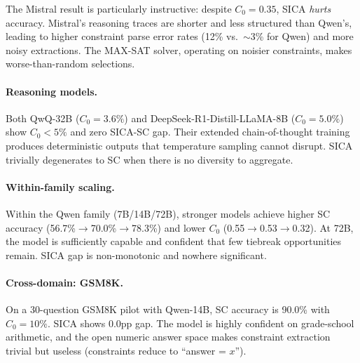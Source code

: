 \documentclass[11pt,a4paper]{article}
\begin{document}
The Mistral result is particularly instructive: despite $C_0=0.35$, SICA \emph{hurts} accuracy.
Mistral's reasoning traces are shorter and less structured than Qwen's, leading to higher constraint parse error rates (12\% vs.\ $\sim$3\% for Qwen) and more noisy extractions.
The MAX-SAT solver, operating on noisier constraints, makes worse-than-random selections.

\paragraph{Reasoning models.}
Both QwQ-32B ($C_0=3.6\%$) and DeepSeek-R1-Distill-LLaMA-8B ($C_0=5.0\%$) show $C_0<5\%$ and zero SICA-SC gap.
Their extended chain-of-thought training produces deterministic outputs that temperature sampling cannot disrupt.
SICA trivially degenerates to SC when there is no diversity to aggregate.

\paragraph{Within-family scaling.}
Within the Qwen family (7B/14B/72B), stronger models achieve higher SC accuracy (56.7\%$\to$70.0\%$\to$78.3\%) and lower $C_0$ (0.55$\to$0.53$\to$0.32).
At 72B, the model is sufficiently capable and confident that few tiebreak opportunities remain.
SICA gap is non-monotonic and nowhere significant.

\paragraph{Cross-domain: GSM8K.}
On a 30-question GSM8K pilot with Qwen-14B, SC accuracy is 90.0\% with $C_0=10\%$.
SICA shows 0.0pp gap.
The model is highly confident on grade-school arithmetic, and the open numeric answer space makes constraint extraction trivial but useless (constraints reduce to ``answer = $x$'').
\end{document}
